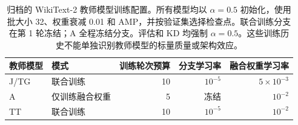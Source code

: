\begin{table}[!t]\centering
\begin{tabular}{llrrr}
\toprule
教师模型 & 模式 & 训练轮次预算 & 分支学习率 & 融合权重学习率\\
\midrule
J/TG & 联合训练 & 10 & $10^{-5}$ & $5\times10^{-3}$\\
A & 仅训练融合权重 & 5 & 冻结 & $10^{-2}$\\
TT & 联合训练 & 10 & $10^{-5}$ & $10^{-2}$\\
\bottomrule
\end{tabular}
\caption{归档的 WikiText-2 教师模型训练配置。所有模型均以 $\alpha=0.5$ 初始化，使用批大小 32、权重衰减 0.01 和 AMP，并按验证集选择检查点。联合训练分支在第 1 轮冻结；A 全程冻结分支。评估和 KD 均强制 $\alpha=0.5$。这些训练历史不能单独识别教师模型的标量质量或架构效应。}
\label{tab:teacher_training_protocol}
\end{table}
